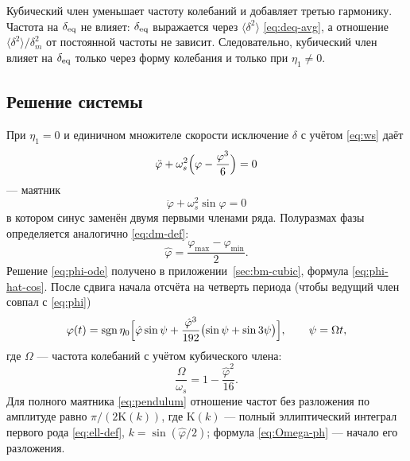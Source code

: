 Кубический член уменьшает частоту колебаний и добавляет третью гармонику. Частота на $\delta_{\mathrm{eq}}$ не влияет: $\delta_{\mathrm{eq}}$ выражается через $\langle\delta^2\rangle$ \eqref{eq:deq-avg}, а отношение $\langle\delta^2\rangle/\delta_m^2$ от постоянной частоты не зависит. Следовательно, кубический член влияет на $\delta_{\mathrm{eq}}$ только через форму колебания и только при $\eta_1\neq 0$.

\subsection{Решение системы}

При $\eta_1=0$ и единичном множителе скорости исключение $\delta$ с учётом \eqref{eq:ws} даёт
\begin{equation}
\label{eq:phi-ode}
\ddot\varphi+\omega_s^2\Bigl(\varphi-\frac{\varphi^3}{6}\Bigr)=0
\end{equation}
--- маятник
\begin{equation}
\label{eq:pendulum}
\ddot\varphi+\omega_s^2\sin\varphi=0
\end{equation}
в котором синус заменён двумя первыми членами ряда. Полуразмах фазы определяется аналогично \eqref{eq:dm-def}:
\begin{equation}
\label{eq:phihat-def}
\hat\varphi=\frac{\varphi_{\max}-\varphi_{\min}}{2}.
\end{equation}
Решение \eqref{eq:phi-ode} получено в приложении~\ref{sec:bm-cubic}, формула \eqref{eq:phi-hat-cos}. После сдвига начала отсчёта на четверть периода (чтобы ведущий член совпал с \eqref{eq:phi})
\begin{equation}
\label{eq:phi-ph}
\varphi(t)
=\operatorname{sgn}\eta_0\Bigl[
\hat\varphi\sin\psi
+\frac{\hat\varphi^3}{192}\bigl(\sin\psi+\sin 3\psi\bigr)
\Bigr],
\qquad
\psi=\Omega t,
\end{equation}
где $\Omega$ --- частота колебаний с учётом кубического члена:
\begin{equation}
\label{eq:Omega-ph}
\frac{\Omega}{\omega_s}=1-\frac{\hat\varphi^2}{16}.
\end{equation}
Для полного маятника \eqref{eq:pendulum} отношение частот без разложения по амплитуде равно $\pi/(2\mathrm{K}(k))$, где $\mathrm{K}(k)$ --- полный эллиптический интеграл первого рода \eqref{eq:ell-def}, $k=\sin(\hat\varphi/2)$; формула \eqref{eq:Omega-ph} --- начало его разложения.

